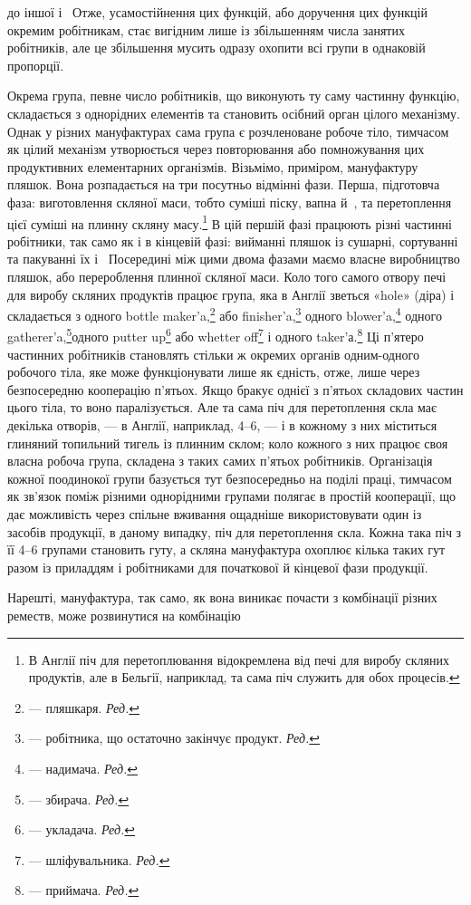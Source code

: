 \parcont{}  %
до іншої і~ Отже, усамостійнення цих функцій, або доручення
цих функцій окремим робітникам, стає вигідним лише із збільшенням
числа занятих робітників, але це збільшення мусить
одразу охопити всі групи в однаковій пропорції.

Окрема група, певне число робітників, що виконують ту саму
частинну функцію, складається з однорідних елементів та становить
осібний орган цілого механізму. Однак у різних мануфактурах
сама група є розчленоване робоче тіло, тимчасом як цілий
механізм утворюється через повторювання або помножування
цих продуктивних елементарних організмів. Візьмімо, приміром,
мануфактуру пляшок. Вона розпадається на три посутньо відмінні
фази. Перша, підготовча фаза: виготовлення скляної маси,
тобто суміші піску, вапна й~, та перетоплення цієї суміші
на плинну скляну масу.\footnote{
В Англії піч для перетоплювання відокремлена від печі для виробу
скляних продуктів, але в Бельгії, наприклад, та сама піч служить
для обох процесів.
} В цій першій фазі працюють різні
частинні робітники, так само як і в кінцевій фазі: вийманні
пляшок із сушарні, сортуванні та пакуванні їх і~ Посередині
між цими двома фазами маємо власне виробництво пляшок, або
перероблення плинної скляної маси. Коло того самого отвору
печі для виробу скляних продуктів працює група, яка в Англії
зветься «hole» (діра) і складається з одного bottle maker’a,\footnote*{
— пляшкаря. \emph{Ред.}
}
або finisher’a,\footnote*{
— робітника, що остаточно закінчує продукт. \emph{Ред.}
} одного blower’a,\footnote*{
— надимача. \emph{Ред.}
} одного gatherer’a,\footnote*{
— збирача. \emph{Ред.}
}одного
putter up\footnote*{
— укладача. \emph{Ред.}
} або whetter off\footnote*{
— шліфувальника. \emph{Ред.}
} і одного taker’а.\footnote*{
— приймача. \emph{Ред.}
}
Ці п’ятеро частинних робітників становлять стільки ж окремих
органів одним-одного робочого тіла, яке може функціонувати лише
як єдність, отже, лише через безпосередню кооперацію п’ятьох.
Якщо бракує однієї з п’ятьох складових частин цього тіла, то
воно паралізується. Але та сама піч для перетоплення скла має декілька
отворів, — в Англії, наприклад, 4--6, — і в кожному з них
міститься глиняний топильний тигель із плинним склом; коло кожного
з них працює своя власна робоча група, складена з таких самих
п’ятьох робітників. Організація кожної поодинокої групи базується
тут безпосередньо на поділі праці, тимчасом як зв’язок поміж
різними однорідними групами полягає в простій кооперації,
що дає можливість через спільне вживання ощадніше використовувати
один із засобів продукції, в даному випадку, піч для перетоплення
скла. Кожна така піч з її 4--6 групами становить гуту,
а скляна мануфактура охоплює кілька таких гут разом із приладдям
і робітниками для початкової й кінцевої фази продукції.

Нарешті, мануфактура, так само, як вона виникає почасти
з комбінації різних реместв, може розвинутися на комбінацію
\parbreak{}  %
